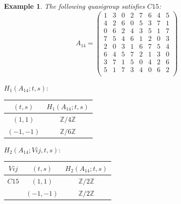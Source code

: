 \documentclass[11pt]{amsart}
\newtheorem{example}[theorem]{Example}
\theoremstyle{definition}
\newcommand{\Z}{\mathbb{Z}}
\begin{document}
\begin{example}
The following quasigroup satisfies 
$C15$:
   \[ A_{14} = \left(
\begin{array}{cccccccc}
 1 & 3 & 0 & 2 & 7 & 6 & 4 & 5 \\
 4 & 2 & 6 & 0 & 5 & 3 & 7 & 1 \\
 0 & 6 & 2 & 4 & 3 & 5 & 1 & 7 \\
 7 & 5 & 4 & 6 & 1 & 2 & 0 & 3 \\
 2 & 0 & 3 & 1 & 6 & 7 & 5 & 4 \\
 6 & 4 & 5 & 7 & 2 & 1 & 3 & 0 \\
 3 & 7 & 1 & 5 & 0 & 4 & 2 & 6 \\
 5 & 1 & 7 & 3 & 4 & 0 & 6 & 2 \\
\end{array}
\right)\]


\bigskip


$H_1(A_{14};t,s):$

\begin{center}
    
\begin{tabular}{c|c}
    $(t,s)$ & $H_1(A_{14};t,s)$  \\
    \hline
    $(1,1)$ & $\Z/4\Z$ \\
    $(-1,-1)$ & $\Z/6\Z$ \\
\end{tabular}
\end{center}
\bigskip

$H_2(A_{14};Vij,t,s):$

\begin{center}
    
\begin{tabular}{c|c|c}
    $Vij$ & $(t,s)$ & $H_2(A_{14};t,s)$  \\
    \hline

    $C15$ & $(1,1)$ & $\Z/2\Z$ \\
        & $(-1,-1)$ & $\Z/2\Z$ \\
\end{tabular}

\end{center}

\end{example}
\end{document}
